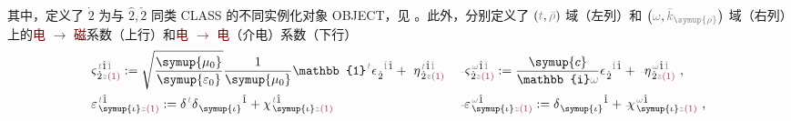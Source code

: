 其中，定义了 $\dot{2}$ 为与 $\hat{2},\check{2}$ 同类 CLASS 的不同实例化对象 OBJECT，见 。此外，分别定义了 $\left( \mathcolor{gray}{t}, \mathcolor{gray}{\bar{\rho}} \right)$ 域（左列）和 $\left( \mathcolor{gray}{\omega}, \mathcolor{gray}{\bar{k}_{\symup{\rho}}} \right)$ 域（右列）上的\textcolor{Maroon}{电 $\to$ 磁}系数（上行）和\textcolor{Maroon}{电 $\to$ 电}（介电）系数（下行）
\begin{subequations}
\begin{align}
	&\varsigma^{\;\! \mathcolor{gray}{t} \hat{1} \mathcolor{gray}{\check{1}}}_{\;\! \dot{2} \mathcolor{gray}{z} \textcolor{Maroon}{(1)}} := \sqrt{\frac{\symup{\mu_0}}{\symup{\varepsilon_0}}} \frac{1}{\symup{\mu_0}} \mathbb{1}^{\;\! \mathcolor{gray}{t}} \epsilon^{\;\! \hphantom{\dot{2}} \mathcolor{gray}{\check{1}} \hat{1}}_{\;\! \dot{2}} + ~\eta^{\;\! \mathcolor{gray}{t} \hat{1} \mathcolor{gray}{\check{1}}}_{\;\! \dot{2} \mathcolor{gray}{z} \textcolor{Maroon}{(1)}}
	&&\Xint{\begin{smallmatrix} ~ \\ {}^{}_{\mathcolor{gray}{-}} \\ ~ \end{smallmatrix}}{13}{\varsigma}^{\;\! \mathcolor{gray}{\omega} \hat{1} \mathcolor{gray}{\check{1}}}_{\;\! \dot{2} \mathcolor{gray}{z} \textcolor{Maroon}{(1)}} := \frac{\symup{c}}{\mathbb{i} \mathcolor{gray}{\omega}} \epsilon^{\;\! \hphantom{\dot{2}} \mathcolor{gray}{\check{1}} \hat{1}}_{\;\! \dot{2}} + \Xint{\begin{smallmatrix} ~ \\ {}^{}_{\mathcolor{gray}{-}} \\ ~ \end{smallmatrix}}{17}{\eta}^{\;\! \mathcolor{gray}{\omega} \hat{1} \mathcolor{gray}{\check{1}}}_{\;\! \dot{2} \mathcolor{gray}{z} \textcolor{Maroon}{(1)}}~, \label{eq:varsigma_rho} \\
	&\varepsilon^{\;\! \mathcolor{gray}{t} \hat{1}}_{\;\! \symup{\iota} \mathcolor{gray}{z} \textcolor{Maroon}{(1)}} := \delta^{\;\! \mathcolor{gray}{t}} \delta^{\;\! \hphantom{\symup{\iota}} \hat{1}}_{\;\! \symup{\iota} \hphantom{z}} + \chi^{\;\! \mathcolor{gray}{t} \hat{1}}_{\;\! \symup{\iota} \mathcolor{gray}{z} \textcolor{Maroon}{(1)}}
	&&\Xint{\begin{smallmatrix} ~ \\ {}^{}_{\mathcolor{gray}{-}} \\ ~ \end{smallmatrix}}{16}{\varepsilon}^{\;\! \mathcolor{gray}{\omega} \hat{1}}_{\;\! \symup{\iota} \mathcolor{gray}{z} \textcolor{Maroon}{(1)}} := \delta^{\;\! \hphantom{\symup{\iota}} \hat{1}}_{\;\! \symup{\iota} \hphantom{z}} + \Xint{{}^{}_{\mathcolor{gray}{-}}}{23}{\chi}^{\;\! \mathcolor{gray}{\omega} \hat{1}}_{\;\! \symup{\iota} \mathcolor{gray}{z} \textcolor{Maroon}{(1)}}~, \label{eq:varepsilon_rho}
\end{align}
\end{subequations}
